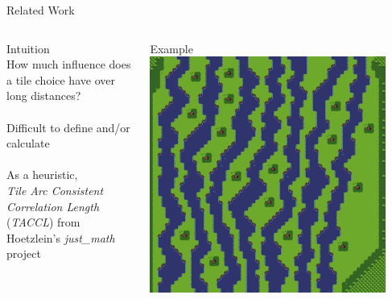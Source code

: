 \documentclass{beamer}
\begin{document}
  \begin{frame}[fragile]{Related Work}
    \begin{columns}[T,onlytextwidth]
        \begin{block}{Intuition}
          \hfill \\
          How much influence does a tile choice have over long distances? \\
          \hfill \\
          Difficult to define and/or calculate \\
          \hfill \\
          As a heuristic, \\
          \textit{Tile Arc Consistent Correlation Length} (\textit{TACCL}) 
            from Hoetzlein's \textit{just\_math} project
        \end{block}
        \begin{block}{Example}
          \includegraphics[width=0.9\textwidth]{img/forestmicro_64x64.pdf}
        \end{block}
    \end{columns}
  \end{frame}

\end{document}
